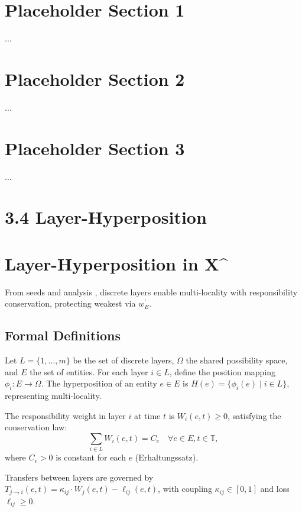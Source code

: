 \documentclass{article}
\begin{document}
\section{Placeholder Section 1} ...
\section{Placeholder Section 2} ...
\section{Placeholder Section 3} ...

\section{3.4 Layer-Hyperposition}
\label{sec:3.4}

\section{Layer-Hyperposition in X^\infty}
\label{sec:layer-hyperposition}

From seeds and analysis \cite{user_idea_2025}, discrete layers enable multi-locality with responsibility conservation, protecting weakest via $w_E^\prime$.

\subsection{Formal Definitions}

Let $L = \{1, \dots, m\}$ be the set of discrete layers, $\Omega$ the shared possibility space, and $E$ the set of entities. For each layer $i \in L$, define the position mapping $\phi_i: E \to \Omega$. The hyperposition of an entity $e \in E$ is $H(e) = \{\phi_i(e) \mid i \in L\}$, representing multi-locality.

The responsibility weight in layer $i$ at time $t$ is $W_i(e, t) \geq 0$, satisfying the conservation law:
\begin{equation}\label{eq:conservation}
\sum_{i \in L} W_i(e, t) = C_e \quad \forall e \in E, t \in \mathbb{T},
\end{equation}
where $C_e > 0$ is constant for each $e$ (Erhaltungssatz).

Transfers between layers are governed by $T_{j \to i}(e, t) = \kappa_{ij} \cdot W_j(e, t) - \ell_{ij}(e, t)$, with coupling $\kappa_{ij} \in [0,1]$ and loss $\ell_{ij} \geq 0$.
\end{document}
